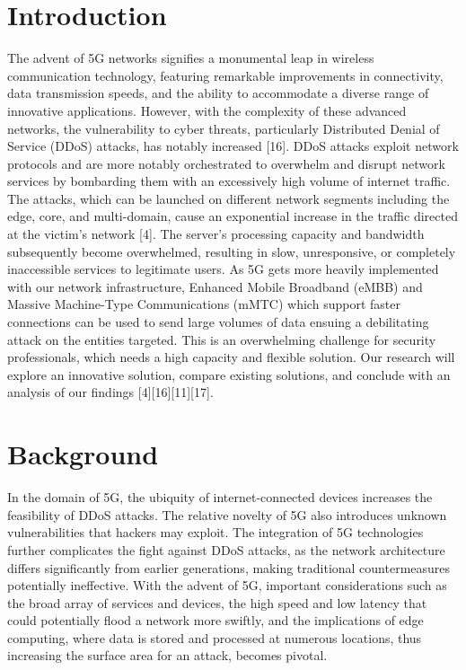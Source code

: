 \documentclass[conference]{IEEEtran}
\begin{document}
\section{Introduction}
The advent of 5G networks signifies a monumental leap in wireless communication technology, featuring remarkable improvements in connectivity, data transmission speeds, and the ability to accommodate a diverse range of innovative applications. However, with the complexity of these advanced networks, the vulnerability to cyber threats, particularly Distributed Denial of Service (DDoS) attacks, has notably increased [16]. DDoS attacks exploit network protocols and are more notably orchestrated to overwhelm and disrupt network services by bombarding them with an excessively high volume of internet traffic. The attacks, which can be launched on different network segments including the edge, core, and multi-domain, cause an exponential increase in the traffic directed at the victim's network [4]. The server's processing capacity and bandwidth subsequently become overwhelmed, resulting in slow, unresponsive, or completely inaccessible services to legitimate users. As 5G gets more heavily implemented with our network infrastructure, Enhanced Mobile Broadband (eMBB) and Massive Machine-Type Communications (mMTC) which support faster connections can be used to send large volumes of data ensuing a debilitating attack on the entities targeted. This is an overwhelming challenge for security professionals, which needs a high capacity and flexible solution. Our research will explore an innovative solution, compare existing solutions, and conclude with an analysis of our findings [4][16][11][17]. 


\section{Background}
In the domain of 5G, the ubiquity of internet-connected devices increases the feasibility of DDoS attacks. The relative novelty of 5G also introduces unknown vulnerabilities that hackers may exploit. The integration of 5G technologies further complicates the fight against DDoS attacks, as the network architecture differs significantly from earlier generations, making traditional countermeasures potentially ineffective. With the advent of 5G, important considerations such as the broad array of services and devices, the high speed and low latency that could potentially flood a network more swiftly, and the implications of edge computing, where data is stored and processed at numerous locations, thus increasing the surface area for an attack, becomes pivotal.
\end{document}
